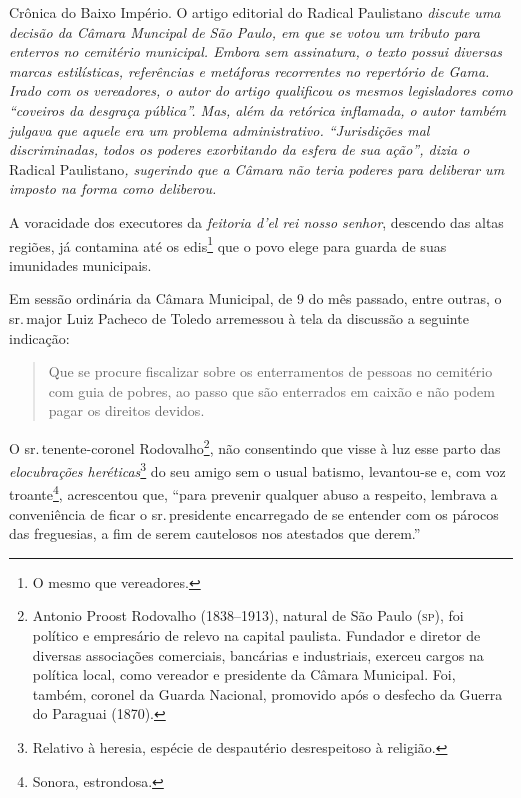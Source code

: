 \begin{didascalia}
Crônica do Baixo Império. O artigo editorial do Radical Paulistano
\emph{discute uma decisão da Câmara Muncipal de São Paulo, em que se
votou um tributo para enterros no cemitério municipal. Embora sem
assinatura, o texto possui diversas marcas estilísticas, referências e
metáforas recorrentes no repertório de Gama. Irado com os vereadores, o
autor do artigo qualificou os mesmos legisladores como ``coveiros da
desgraça pública''. Mas, além da retórica inflamada, o autor também
julgava que aquele era um problema administrativo. ``Jurisdições mal
discriminadas, todos os poderes exorbitando da esfera de sua ação'',
dizia o} Radical Paulistano\emph{, sugerindo que a Câmara não teria
poderes para deliberar um imposto na forma como deliberou.}
\end{didascalia}



A voracidade dos executores da \emph{feitoria d'el rei nosso senhor},
descendo das altas regiões, já contamina até os edis\footnote{O mesmo
  que vereadores.} que o povo elege para guarda de suas imunidades
municipais.

Em sessão ordinária da Câmara Municipal, de 9 do mês passado, entre
outras, o sr.\,major Luiz Pacheco de Toledo arremessou à tela da
discussão a seguinte indicação:

\begin{quote}
Que se procure fiscalizar sobre os enterramentos de pessoas no
cemitério com guia de pobres, ao passo que são enterrados em caixão e
não podem pagar os direitos devidos.
\end{quote}

O sr.\,tenente-coronel Rodovalho\footnote{Antonio Proost Rodovalho
  (1838--1913), natural de São Paulo (\textsc{sp}), foi político e empresário de
  relevo na capital paulista. Fundador e diretor de diversas associações
  comerciais, bancárias e industriais, exerceu cargos na política local,
  como vereador e presidente da Câmara Municipal. Foi, também, coronel
  da Guarda Nacional, promovido após o desfecho da Guerra do Paraguai
  (1870).}, não consentindo que visse à luz esse parto das
\emph{elocubrações heréticas}\footnote{Relativo à heresia, espécie de
  despautério desrespeitoso à religião.} do seu amigo sem o usual
batismo, levantou-se e, com voz troante\footnote{Sonora, estrondosa.},
acrescentou que, ``para prevenir qualquer abuso a respeito, lembrava a
conveniência de ficar o sr.\,presidente encarregado de se entender com os
párocos das freguesias, a fim de serem cautelosos nos atestados que
derem.''

